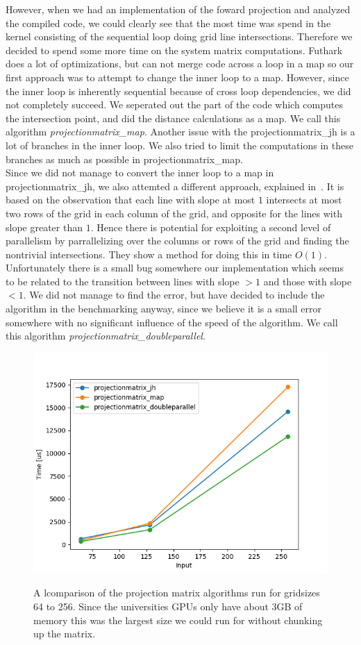 However, when we had an implementation of the foward projection and analyzed the compiled code, we could clearly see that the most time was spend in the kernel consisting of the sequential loop doing grid line intersections. Therefore we decided to spend some more time on the system matrix computations. Futhark does a lot of optimizations, but can not merge code across a loop in a map so our first approach was to attempt to change the inner loop to a map. However, since the inner loop is inherently sequential because of cross loop dependencies, we did not completely succeed. We seperated out the part of the code which computes the intersection point, and did the distance calculations as a map. We call this algorithm \emph{projectionmatrix\_map}.
Another issue with the projectionmatrix\_jh is a lot of branches in the inner loop. We also tried to limit the computations in these branches as much as possible in projectionmatrix\_map.\\
Since we did not manage to convert the inner loop to a map in projectionmatrix\_jh, we also attemted a different approach, explained in~\cite{Gao2012}. It is based on the observation that each line with slope at most $1$ intersects at most two rows of the grid in each column of the grid, and opposite for the lines with slope greater than $1$. Hence there is potential for exploiting a second level of parallelism by parrallelizing over the columns or rows of the grid and finding the nontrivial intersections. They show a method for doing this in time $O(1)$. Unfortunately there is a small bug somewhere our implementation which seems to be related to the transition between lines with slope $>1$ and those with slope $<1$. We did not manage to find the error, but have decided to include the algorithm in the benchmarking anyway, since we believe it is a small error somewhere with no significant influence of the speed of the algorithm. We call this algorithm \emph{projectionmatrix\_doubleparallel}.\\
\begin{figure}[h]
\includegraphics{images/resultsMatrixPlot.png}
\label{sysmatcompare}
  \caption{A lcomparison of the projection matrix algorithms run for gridsizes 64 to 256. Since the universities GPUs only have about 3GB of memory this was the largest size we could run for without chunking up the matrix.}
\end{figure}

